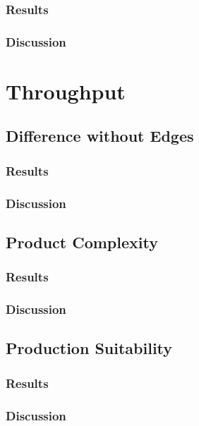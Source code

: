 \subsubsection{Results}

\subsubsection{Discussion}

\section{Throughput}

\subsection{Difference without Edges}

\subsubsection{Results}

\subsubsection{Discussion}

\subsection{Product Complexity}

\subsubsection{Results}

\subsubsection{Discussion}

\subsection{Production Suitability}

\subsubsection{Results}

\subsubsection{Discussion}

